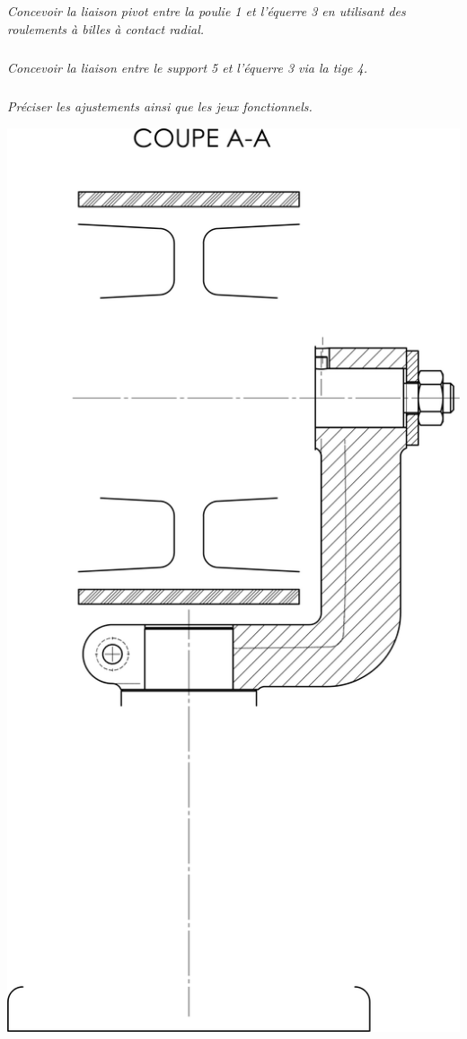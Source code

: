 \documentclass[10pt]{article}
\begin{document}
\subparagraph{}\textit{Concevoir la liaison pivot entre la poulie 1 et l’équerre 3 en utilisant des roulements à billes à contact radial.}
\subparagraph{}\textit{Concevoir la liaison entre le support 5 et l’équerre 3 via la tige 4.}
\subparagraph{}\textit{Préciser les ajustements ainsi que les jeux fonctionnels.}


\begin{center}
\includegraphics[height=\textheight]{images/Fig3}
\end{center}
\end{document}
